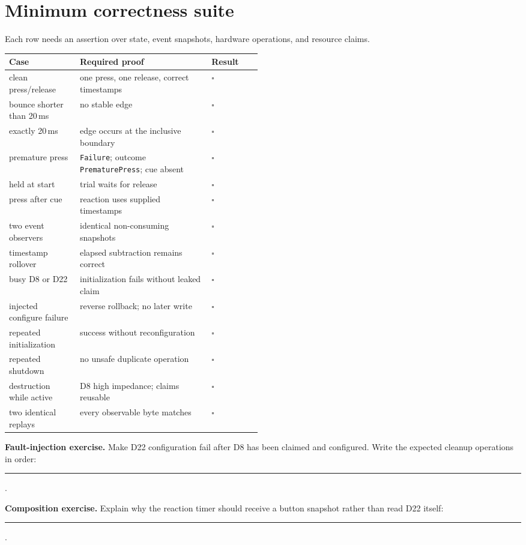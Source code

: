 \documentclass[11pt]{article}
\newcommand{\checkbox}{\(\square\)}
\newcommand{\blank}[1]{\rule{#1}{0.4pt}}
\begin{document}
\newpage
\section{Minimum correctness suite}

Each row needs an assertion over state, event snapshots, hardware operations,
and resource claims.

\begin{tabularx}{\linewidth}{@{}p{0.29\linewidth}X p{0.20\linewidth}@{}}
\toprule
Case & Required proof & Result\\
\midrule
clean press/release & one press, one release, correct timestamps & \checkbox{}\\
bounce shorter than 20\,ms & no stable edge & \checkbox{}\\
exactly 20\,ms & edge occurs at the inclusive boundary & \checkbox{}\\
premature press & \texttt{Failure}; outcome \texttt{PrematurePress}; cue absent & \checkbox{}\\
held at start & trial waits for release & \checkbox{}\\
press after cue & reaction uses supplied timestamps & \checkbox{}\\
two event observers & identical non-consuming snapshots & \checkbox{}\\
timestamp rollover & elapsed subtraction remains correct & \checkbox{}\\
busy D8 or D22 & initialization fails without leaked claim & \checkbox{}\\
injected configure failure & reverse rollback; no later write & \checkbox{}\\
repeated initialization & success without reconfiguration & \checkbox{}\\
repeated shutdown & no unsafe duplicate operation & \checkbox{}\\
destruction while active & D8 high impedance; claims reusable & \checkbox{}\\
two identical replays & every observable byte matches & \checkbox{}\\
\bottomrule
\end{tabularx}

\textbf{Fault-injection exercise.} Make D22 configuration fail after D8 has
been claimed and configured. Write the expected cleanup operations in order:\\[3pt]
\blank{0.98\linewidth}.

\textbf{Composition exercise.} Explain why the reaction timer should receive a
button snapshot rather than read D22 itself:\\[3pt]
\blank{0.98\linewidth}.
\end{document}
